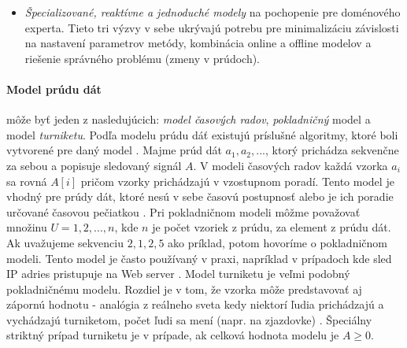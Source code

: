 \begin{itemize}
	\item \textit{Špecializované, reaktívne a jednoduché modely} na pochopenie pre doménového experta. Tieto tri výzvy v sebe ukrývajú potrebu pre minimalizáciu závislosti na nastavení parametrov metódy, kombinácia online a offline modelov a riešenie správného problému (zmeny v prúdoch).
\end{itemize}

\paragraph{Model prúdu dát} môže byť jeden z nasledujúcich: \textit{model časových radov}, \textit{pokladničný} model a model \textit{turniketu}. Podľa modelu prúdu dáť existujú príslušné algoritmy, ktoré boli vytvorené pre daný model \citep{tran2014change}. Majme prúd dát $a_1, a_2, ...$, ktorý prichádza sekvenčne za sebou a popisuje sledovaný signál $A$. 
V modeli časových radov každá vzorka $a_i$ sa rovná $A[i]$ pričom vzorky prichádzajú v vzostupnom poradí. Tento model je vhodný pre prúdy dát, ktoré nesú v sebe časovú postupnosť alebo je ich poradie určované časovou pečiatkou \citep{muthukrishnan2005data}.
Pri pokladničnom modeli môžme považovať množinu $U = {1, 2, ..., n}$, kde $n$ je počet vzoriek z prúdu, za element z prúdu dát. Ak uvažujeme sekvenciu $2, 1, 2, 5$ ako príklad, potom hovoríme o pokladničnom modeli. Tento model je často používaný v praxi, napríklad v prípadoch kde sled IP adries pristupuje na Web server \citep{ikonomovska2013algorithmic, muthukrishnan2005data}.
Model turniketu je veľmi podobný pokladničnému modelu. Rozdiel je v tom, že vzorka môže predstavovať aj zápornú hodnotu - analógia z reálneho sveta kedy niektorí ľudia prichádzajú a vychádzajú turniketom, počet ľudi sa mení (napr. na zjazdovke) \citep{ikonomovska2013algorithmic, muthukrishnan2005data}. Špeciálny striktný prípad turniketu je v prípade, ak celková hodnota modelu je $A \geq 0$.

